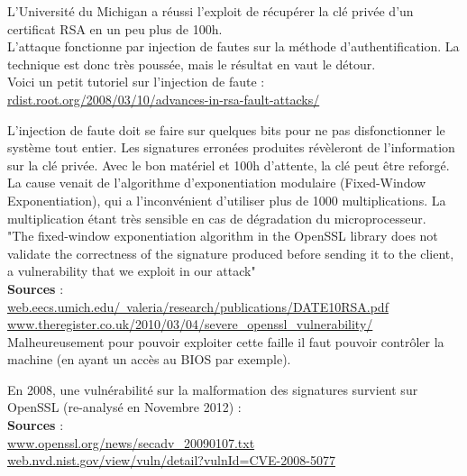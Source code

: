 \documentclass{article}
\begin{document}
	L'Université du Michigan a réussi l'exploit de récupérer la clé privée 
	d'un certificat RSA en un peu plus de 100h.\\
	L'attaque fonctionne par injection de fautes sur la méthode 
	d'authentification. La technique est donc très poussée, mais le résultat 
	en vaut le détour.\\

	Voici un petit tutoriel sur l'injection de faute : \\
	\href{http://rdist.root.org/2008/03/10/advances-in-rsa-fault-attacks/}
	{rdist.root.org/2008/03/10/advances-in-rsa-fault-attacks/}

	L'injection de faute doit se faire sur quelques bits pour ne pas
	disfonctionner le système tout entier. Les signatures erronées produites
	révèleront de l'information sur la clé privée. 
	Avec le bon matériel et 100h d'attente, la clé peut être reforgé.\\

	La cause venait de l'algorithme d'exponentiation modulaire (Fixed-Window 
	Exponentiation), qui a l'inconvénient d'utiliser plus de 1000 multiplications.
	La multiplication étant très sensible en cas de dégradation du microprocesseur.\\
	
	"The fixed-window exponentiation algorithm in the OpenSSL library does not 
	validate the correctness of the signature produced before sending it to the 
	client, a vulnerability that we exploit in our attack"\\

	\textbf{Sources} :\\
	\href{http://web.eecs.umich.edu/~valeria/research/publications/DATE10RSA.pdf}
	{web.eecs.umich.edu/~valeria/research/publications/DATE10RSA.pdf}\\
	\href{http://www.theregister.co.uk/2010/03/04/severe\_openssl\_vulnerability/}
	{www.theregister.co.uk/2010/03/04/severe\_openssl\_vulnerability/}\\
	
	Malheureusement pour pouvoir exploiter cette faille il faut pouvoir
	contrôler la machine (en ayant un accès au BIOS par exemple).
	
	En 2008, une vulnérabilité sur la malformation des signatures survient sur 
	OpenSSL (re-analysé en Novembre 2012) :\\

	\textbf{Sources} : \\
	\href{https://www.openssl.org/news/secadv\_20090107.txt}
	{www.openssl.org/news/secadv\_20090107.txt}\\
	\href{http://web.nvd.nist.gov/view/vuln/detail?vulnId=CVE-2008-5077}
	{web.nvd.nist.gov/view/vuln/detail?vulnId=CVE-2008-5077}\\
\end{document}
